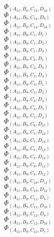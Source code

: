\documentclass[14pt]{article}
\begin{document}
    $\Phi_{({A}_{11}, {B}_{8}, {C}_{13}, {D}_{10})}$ \\ 
    $\Phi_{({A}_{11}, {B}_{8}, {C}_{14}, {D}_{9})}$ \\ 
    $\Phi_{({A}_{11}, {B}_{8}, {C}_{14}, {D}_{10})}$ \\ 
    $\Phi_{({A}_{11}, {B}_{9}, {C}_{1}, {D}_{1})}$ \\ 
    $\Phi_{({A}_{11}, {B}_{9}, {C}_{1}, {D}_{2})}$ \\ 
    $\Phi_{({A}_{11}, {B}_{9}, {C}_{1}, {D}_{3})}$ \\ 
    $\Phi_{({A}_{11}, {B}_{9}, {C}_{2}, {D}_{1})}$ \\ 
    $\Phi_{({A}_{11}, {B}_{9}, {C}_{2}, {D}_{2})}$ \\ 
    $\Phi_{({A}_{11}, {B}_{9}, {C}_{2}, {D}_{3})}$ \\ 
    $\Phi_{({A}_{11}, {B}_{9}, {C}_{3}, {D}_{1})}$ \\ 
    $\Phi_{({A}_{11}, {B}_{9}, {C}_{3}, {D}_{2})}$ \\ 
    $\Phi_{({A}_{11}, {B}_{9}, {C}_{3}, {D}_{3})}$ \\ 
    $\Phi_{({A}_{11}, {B}_{9}, {C}_{4}, {D}_{5})}$ \\ 
    $\Phi_{({A}_{11}, {B}_{9}, {C}_{5}, {D}_{4})}$ \\ 
    $\Phi_{({A}_{11}, {B}_{9}, {C}_{6}, {D}_{15})}$ \\ 
    $\Phi_{({A}_{11}, {B}_{9}, {C}_{7}, {D}_{13})}$ \\ 
    $\Phi_{({A}_{11}, {B}_{9}, {C}_{7}, {D}_{14})}$ \\ 
    $\Phi_{({A}_{11}, {B}_{9}, {C}_{8}, {D}_{13})}$ \\ 
    $\Phi_{({A}_{11}, {B}_{9}, {C}_{8}, {D}_{14})}$ \\ 
    $\Phi_{({A}_{11}, {B}_{9}, {C}_{9}, {D}_{11})}$ \\ 
    $\Phi_{({A}_{11}, {B}_{9}, {C}_{9}, {D}_{12})}$ \\ 
    $\Phi_{({A}_{11}, {B}_{9}, {C}_{10}, {D}_{11})}$ \\ 
    $\Phi_{({A}_{11}, {B}_{9}, {C}_{10}, {D}_{12})}$ \\ 
    $\Phi_{({A}_{11}, {B}_{9}, {C}_{11}, {D}_{9})}$ \\ 
    $\Phi_{({A}_{11}, {B}_{9}, {C}_{11}, {D}_{10})}$ \\ 
    $\Phi_{({A}_{11}, {B}_{9}, {C}_{12}, {D}_{9})}$ \\ 
    $\Phi_{({A}_{11}, {B}_{9}, {C}_{12}, {D}_{10})}$ \\ 
    $\Phi_{({A}_{11}, {B}_{9}, {C}_{13}, {D}_{7})}$ \\ 
\end{document}
